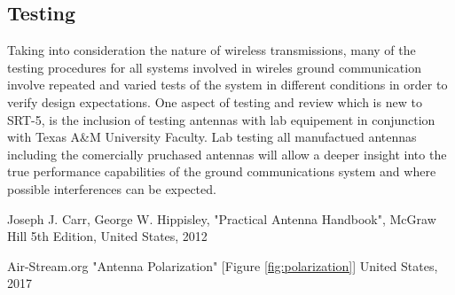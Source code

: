 \documentclass[10pt,a4paper]{article}
\begin{document}
\subsection{Testing}
Taking into consideration the nature of wireless transmissions, many of the testing procedures for all systems involved in wireles ground communication involve repeated and varied tests of the system in different conditions in order to verify design expectations. One aspect of testing and review which is new to SRT-5, is the inclusion of testing antennas with lab equipement in conjunction with Texas A\&M University Faculty. Lab testing all manufactued antennas including the comercially pruchased antennas will allow a deeper insight into the true performance capabilities of the ground communications system and where possible interferences can be expected.



\begin{thebibliography}{10}
	Joseph J. Carr, George W. Hippisley,
	"Practical Antenna Handbook", McGraw Hill 5th Edition,
	United States, 2012

	Air-Stream.org
	"Antenna Polarization" [Figure \ref{fig:polarization}]
	United States, 2017
	
\end{thebibliography}
\end{document}
